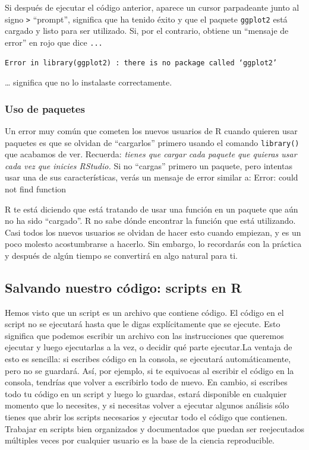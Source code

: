 \documentclass[
  letterpaper,
  DIV=11,
  numbers=noendperiod]{scrreprt}
\begin{document}
Si después de ejecutar el código anterior, aparece un cursor parpadeante
junto al signo \texttt{\textgreater{}} ``prompt'', significa que ha
tenido éxito y que el paquete \texttt{ggplot2} está cargado y listo para
ser utilizado. Si, por el contrario, obtiene un ``mensaje de error'' en
rojo que dice \texttt{...}

\begin{verbatim}
Error in library(ggplot2) : there is no package called ‘ggplot2’
\end{verbatim}

\ldots{} significa que no lo instalaste correctamente.

\hypertarget{uso-de-paquetes}{%
\subsubsection{Uso de paquetes}\label{uso-de-paquetes}}

Un error muy común que cometen los nuevos usuarios de R cuando quieren
usar paquetes es que se olvidan de ``cargarlos'' primero usando el
comando \texttt{library()} que acabamos de ver. Recuerda: \emph{tienes
que cargar cada paquete que quieras usar cada vez que inicies RStudio.}
Si no ``cargas'' primero un paquete, pero intentas usar una de sus
características, verás un mensaje de error similar a: Error: could not
find function

R te está diciendo que está tratando de usar una función en un paquete
que aún no ha sido ``cargado''. R no sabe dónde encontrar la función que
está utilizando. Casi todos los nuevos usuarios se olvidan de hacer esto
cuando empiezan, y es un poco molesto acostumbrarse a hacerlo. Sin
embargo, lo recordarás con la práctica y después de algún tiempo se
convertirá en algo natural para ti.

\hypertarget{salvando-nuestro-cuxf3digo-scripts-en-r}{%
\subsection{Salvando nuestro código: scripts en
R}\label{salvando-nuestro-cuxf3digo-scripts-en-r}}

Hemos visto que un script es un archivo que contiene código. El código
en el script no se ejecutará hasta que le digas explícitamente que se
ejecute. Esto significa que podemos escribir un archivo con las
instrucciones que queremos ejecutar y luego ejecutarlas a la vez, o
decidir qué parte ejecutar.La ventaja de esto es sencilla: si escribes
código en la consola, se ejecutará automáticamente, pero no se guardará.
Así, por ejemplo, si te equivocas al escribir el código en la consola,
tendrías que volver a escribirlo todo de nuevo. En cambio, si escribes
todo tu código en un script y luego lo guardas, estará disponible en
cualquier momento que lo necesites, y si necesitas volver a ejecutar
algunos análisis sólo tienes que abrir los scripts necesarios y ejecutar
todo el código que contienen. Trabajar en scripts bien organizados y
documentados que puedan ser reejecutados múltiples veces por cualquier
usuario es la base de la ciencia reproducible.
\end{document}
